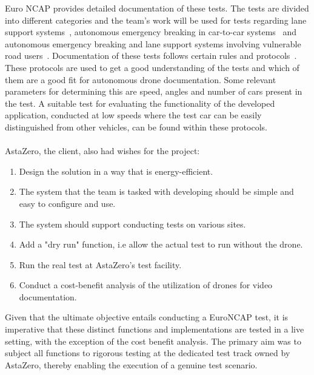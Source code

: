 Euro NCAP provides detailed documentation of these tests. The tests are divided into different categories and the team's work will be used for tests regarding lane support systems~\cite{EuroNCAP2022TESTImplementationc}, autonomous emergency breaking in car-to-car systems~\cite{EuroNCAP2022TESTImplementation} and autonomous emergency breaking and lane support systems involving vulnerable road users~\cite{EuroNCAP2022TESTImplementationb}. Documentation of these tests follows certain rules and protocols~\cite{EuroNCAP2021FILMPROTOCOL}. These protocols are used to get a good understanding of the tests and which of them are a good fit for autonomous drone documentation. Some relevant parameters for determining this are speed, angles and number of cars present in the test. A suitable test for evaluating the functionality of the developed application, conducted at low speeds where the test car can be easily distinguished from other vehicles, can be found within these protocols.
\\ \\
AstaZero, the client, also had wishes for the project:
\begin{enumerate}
    \item Design the solution in a way that is energy-efficient.
    \item The system that the team is tasked with developing should be simple and easy to configure and use.
    \item The system should support conducting tests on various sites.
    \item Add a "dry run" function, i.e allow the actual test to run without the drone.
    \item Run the real test at AstaZero's test facility.
    \item Conduct a cost-benefit analysis of the utilization of drones for video documentation. 
\end{enumerate}
Given that the ultimate objective entails conducting a EuroNCAP test, it is imperative that these distinct functions and implementations are tested in a live setting, with the exception of the cost benefit analysis. The primary aim was to subject all functions to rigorous testing at the dedicated test track owned by AstaZero, thereby enabling the execution of a genuine test scenario.


